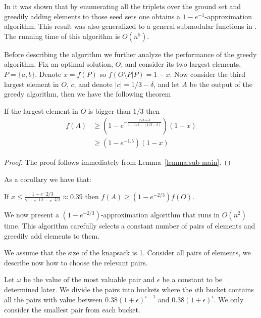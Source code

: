 In \cite{khuller1999budgeted} it was shown that by enumerating all the triplets over the 
ground set and greedily adding elements to those seed sets one obtains a 
$1-e^{-1}$-approximation algorithm.
This result was also generalized to a general submodular functions in \cite{sviridenko2004note}.
The running time of this algorithm is $O(n^5)$.


Before describing the algorithm we further analyze the performance of the greedy algorithm.
Fix an optimal solution, $O$, and consider its two largest elements, $P = \{a, b\}$.
Denote $x = f(P)$ so $f(O \setminus P | P) = 1 - x$.
Now consider the third largest element in $O$, $c$, and denote $|c| = 1/3 - \delta$,
and let $A$ be the output of the greedy algorithm, then we have the following theorem

\begin{theorem}
If the largest element in $O$ is bigger than $1/3$ then 
\begin{align*}
f(A) 	& \geq (1-e^{-\frac{2/3 + \delta}{1 - 1/3 - (1/3 - \delta)}})(1 - x)
\\		& \geq (1 - e^{-1.5})(1 - x) 
\end{align*}
\end{theorem} 

\begin{proof}
The proof follows immediately from Lemma~\ref{lemma:sub-main}.
\end{proof}

As a corollary we have that:

\begin{corollary}
If $x \leq \frac{1 - e^-{2/3}}{2 - e^{-1.5} - e^{-2/3}} \approx 0.39$ 
then $f(A) \geq (1 - e^{-2/3})f(O)$.
\end{corollary}

We now present a $(1-e^{-2/3})$-approximation algorithm that runs in $O(n^2)$ time.
This algorithm carefully selects a constant number of pairs of elements and greedily 
add elements to them.

We assume that the size of the knapsack is 1.
Consider all pairs of elements, we describe now how to choose the relevant pairs.

Let $\omega$ be the value of the most valuable pair and $\epsilon$ be a constant to 
be determined later.
We divide the pairs into buckets where the $i$th bucket contains all the pairs with value
between $0.38 (1 + \epsilon)^{i - 1}$ and $0.38 (1 + \epsilon)^{i}$.
We only consider the smallest pair from each bucket.  

